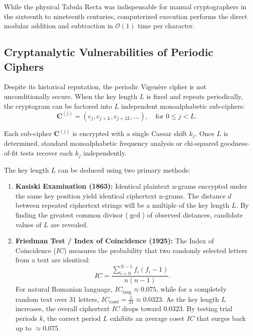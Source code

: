 \documentclass[11pt,a4paper]{article}
\begin{document}
While the physical Tabula Recta was indispensable for manual cryptographers in the sixteenth to nineteenth centuries, computerized execution performs the direct modular addition and subtraction in $\mathcal{O}(1)$ time per character.

\subsection{Cryptanalytic Vulnerabilities of Periodic Ciphers}

Despite its historical reputation, the periodic Vigen\`ere cipher is not unconditionally secure. When the key length $L$ is fixed and repeats periodically, the cryptogram can be factored into $L$ independent monoalphabetic sub-ciphers:
\begin{equation}
  \mathbf{C}^{(j)} = (c_j, c_{j+L}, c_{j+2L}, \dots), \quad \text{for } 0 \le j < L.
\end{equation}

Each sub-cipher $\mathbf{C}^{(j)}$ is encrypted with a single Caesar shift $k_j$. Once $L$ is determined, standard monoalphabetic frequency analysis or chi-squared goodness-of-fit tests recover each $k_j$ independently.

The key length $L$ can be deduced using two primary methods:
\begin{enumerate}
  \item \textbf{Kasiski Examination (1863):} Identical plaintext n-grams encrypted under the same key position yield identical ciphertext n-grams. The distance $d$ between repeated ciphertext strings will be a multiple of the key length $L$. By finding the greatest common divisor ($\gcd$) of observed distances, candidate values of $L$ are revealed.
  \item \textbf{Friedman Test / Index of Coincidence (1925):} The Index of Coincidence ($IC$) measures the probability that two randomly selected letters from a text are identical:
  \begin{equation}
    IC = \frac{\sum_{i=0}^{N-1} f_i (f_i - 1)}{n(n - 1)}.
  \end{equation}
  For natural Romanian language, $IC_{\text{lang}} \approx 0.075$, while for a completely random text over 31 letters, $IC_{\text{rand}} = \frac{1}{31} \approx 0.0323$. As the key length $L$ increases, the overall ciphertext $IC$ drops toward $0.0323$. By testing trial periods $k$, the correct period $L$ exhibits an average coset $IC$ that surges back up to $\approx 0.075$.
\end{enumerate}
\end{document}
